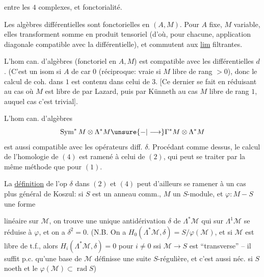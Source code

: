  entre les $4$ complexes, et fonctorialité.

Les  algèbres différentielles sont fonctorielles en $(A,M)$. Pour $A$ fixe, $M$ variable, elles transforment somme en produit tensoriel (d'où, pour chacune, application diagonale compatible avec  la différentielle), et commutent aux \uline{lim} filtrantes.

L'hom can. d'algèbres (fonctoriel en $A,M$)
est compatible avec les différentielles $d$. (C'est un isom  si $A$ de car $0$ (réciproque: vraie si  $M$ libre de rang $>0$), donc le calcul de coh. dans $1$ est contenu dans celui de $3$. [Ce dernier se fait en réduisant au cas où $M$ est libre de  par Lazard, puis par Künneth au cas $M$ libre de rang $1$, auquel cas c'est trivial].

L'hom can. d'algèbres
\[
\operatorname{Sym}^*M\otimes\Lambda^*M\unsure{-|\longrightarrow}\Gamma^*M\otimes\Lambda^*M
\]
est aussi compatible avec les opérateurs diff. $\delta$.    Procédant comme dessus, le calcul de l'homologie de $(4)$ est ramené à celui de $(2)$, qui peut se traiter par la même méthode que pour $(1)$.

La \uline{définition} de l'op $\delta$ dans $(2)$ et $(4)$ peut d'ailleurs se ramener à un cas plus général de Koszul: si $S$ est un anneau comm., $M$ un $S$-module,  et $\varphi:M-S$ une forme

linéaire sur $\mathcal M$, on trouve une unique antidérivation $\delta$ de $\Lambda^*\mathcal M$ qui sur $\Lambda^1\mathcal M$ se réduise à $\varphi$, et on a $\delta^2=0$. (N.B. On a $H_0(\Lambda^*\mathcal M,\delta)=S/\varphi(\mathcal M)$, et si $\mathcal M$ est libre de t.f., alors $H_i(\Lambda^*\mathcal M,\delta)=0$ pour $i\neq0$ ssi $\mathcal M\longrightarrow S$ est ``transverse'' -- il suffit p.c. qu'une base  de $\mathcal M$ définisse une suite $S$-régulière, et c'est aussi néc. si $S$ noeth et le $\varphi(\mathcal M)\subset\operatorname{rad}S$)

